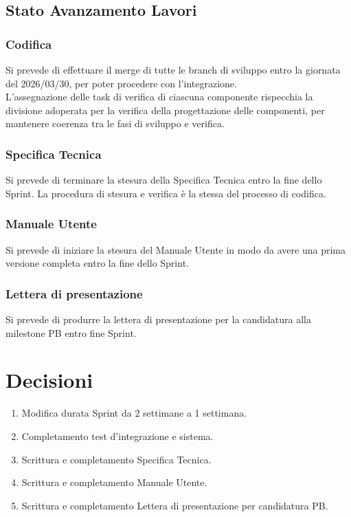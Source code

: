 \documentclass[a4paper,12pt]{article}
\begin{document}
\subsection{Stato Avanzamento Lavori}

\subsubsection{Codifica}
Si prevede di effettuare il merge di tutte le branch di sviluppo entro la giornata del 2026/03/30, per poter procedere con l'integrazione.\\

L'assegnazione delle task di verifica di ciascuna componente rispecchia la divisione adoperata per la verifica della progettazione delle componenti, per mantenere coerenza tra le fasi di sviluppo e verifica.\\


\subsubsection{Specifica Tecnica}
Si prevede di terminare la stesura della Specifica Tecnica entro la fine dello Sprint. La procedura di stesura e verifica è la stessa del processo di codifica.

\subsubsection{Manuale Utente}
Si prevede di iniziare la stesura del Manuale Utente in modo da avere una prima versione completa entro la fine dello Sprint.

\subsubsection{Lettera di presentazione}
Si prevede di produrre la lettera di presentazione per la candidatura alla milestone PB entro fine Sprint.

\section{Decisioni}
\begin{enumerate}
    \item Modifica durata Sprint da 2 settimane a 1 settimana.
    \item Completamento test d'integrazione e sistema.
    \item Scrittura e completamento Specifica Tecnica.
    \item Scrittura e completamento Manuale Utente.
    \item Scrittura e completamento Lettera di presentazione per candidatura PB.
\end{enumerate}
\end{document}
